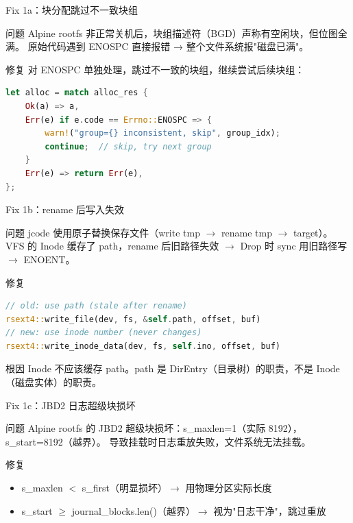 \documentclass{beamer}
\begin{document}
\begin{frame}[fragile]{Fix 1a：块分配跳过不一致块组}
  \begin{block}{问题}
    Alpine rootfs 非正常关机后，块组描述符（BGD）声称有空闲块，但位图全满。
    原始代码遇到 ENOSPC 直接报错 → 整个文件系统报"磁盘已满"。
  \end{block}
  \begin{block}{修复}
    对 ENOSPC 单独处理，跳过不一致的块组，继续尝试后续块组：
    \begin{lstlisting}[language=Rust]
let alloc = match alloc_res {
    Ok(a) => a,
    Err(e) if e.code == Errno::ENOSPC => {
        warn!("group={} inconsistent, skip", group_idx);
        continue;  // skip, try next group
    }
    Err(e) => return Err(e),
};\end{lstlisting}
  \end{block}
\end{frame}

\begin{frame}[fragile]{Fix 1b：rename 后写入失效}
  \begin{block}{问题}
    jcode 使用原子替换保存文件（write tmp $\to$ rename tmp $\to$ target）。
    VFS 的 Inode 缓存了 path，rename 后旧路径失效 $\to$ Drop 时 sync 用旧路径写 $\to$ ENOENT。
  \end{block}
  \begin{block}{修复}
    \begin{lstlisting}[language=Rust]
// old: use path (stale after rename)
rsext4::write_file(dev, fs, &self.path, offset, buf)
// new: use inode number (never changes)
rsext4::write_inode_data(dev, fs, self.ino, offset, buf)\end{lstlisting}
  \end{block}
  \begin{block}{根因}
    Inode 不应该缓存 path。path 是 DirEntry（目录树）的职责，不是 Inode（磁盘实体）的职责。
  \end{block}
\end{frame}

\begin{frame}{Fix 1c：JBD2 日志超级块损坏}
  \begin{block}{问题}
    Alpine rootfs 的 JBD2 超级块损坏：s\_maxlen=1（实际 8192），s\_start=8192（越界）。
    导致挂载时日志重放失败，文件系统无法挂载。
  \end{block}
  \begin{block}{修复}
    \begin{itemize}
      \item s\_maxlen $<$ s\_first（明显损坏）$\to$ 用物理分区实际长度
      \item s\_start $\ge$ journal\_blocks.len()（越界）$\to$ 视为"日志干净"，跳过重放
    \end{itemize}
  \end{block}
\end{frame}
\end{document}
